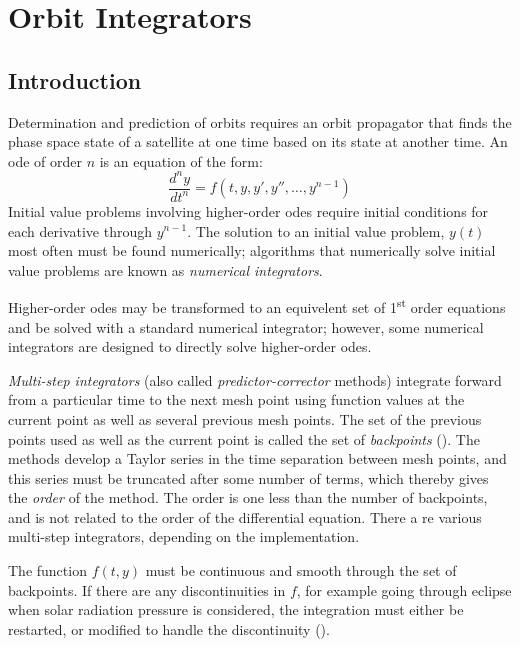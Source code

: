 \chapter{Orbit Integrators}
\label{ch:orbit-integrators}

\section{Introduction}
Determination and prediction of orbits requires an orbit propagator that finds the
phase space state of a satellite at one time based on its state at another time.
An \gls{ode} of order \( n \) is an equation of the form:
\begin{equation}
	\frac{d^n y}{dt^n} = f(t,y,y',y'',\ldots,y^{n-1})
\end{equation}
Initial value problems involving higher-order \glspl{ode} require initial conditions 
for each derivative through \( y^{n-1} \). 
The solution to an initial value problem, \( y(t) \) most often must be found numerically;
algorithms that numerically solve initial value problems are known as \emph{numerical integrators}.

Higher-order \glspl{ode} may be transformed to an equivelent set of 1\textsuperscript{st} 
order equations and be solved with a standard numerical integrator; however, some 
numerical integrators are designed to directly solve higher-order \glspl{ode}.

\emph{Multi-step integrators} (also called \emph{predictor-corrector} methods) 
integrate forward from a particular time to the next mesh
point using function values at the current point as well as several previous mesh
points. The set of the previous points used as well as the current point is called the
set of \emph{backpoints} (\cite{berry2004}). The methods develop a Taylor series 
in the time separation between mesh points, and this series must be truncated after 
some number of terms, which thereby gives the \emph{order} of the method. The order is one 
less than the number of backpoints, and is not related to the order of the differential equation.
There a re various multi-step integrators, depending on the implementation.

The function \( f(t,y) \) must be continuous and smooth through the set of 
backpoints. If there are any discontinuities in \( f \), for example going through eclipse when 
solar radiation pressure is considered, the integration must either be restarted, or 
modified to handle the discontinuity (\cite{berry2004}).

